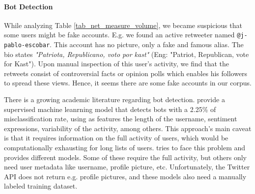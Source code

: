         
        \paragraph{Bot Detection} 
        While analyzing Table \ref{tab_net_measure_volume}, we became suspicious that some users might be fake accounts. E.g. we found an active retweeter named \texttt{@j-pablo-escobar}. %
        This account has no picture, only a fake and famous alias. The bio states {\it "Patriota, Republicano, voto por kast"} (Eng: "Patriot, Republican, vote for Kast"). Upon manual inspection of this user's activity, we find that the retweets consist of controversial facts or opinion polls which enables his followers to spread these views. Hence, it seems there are some fake accounts in our corpus.
        
        There is a growing academic literature regarding bot detection. \cite{efthimion2018supervised} provide a supervised machine leanrning model that detects bots with a 2.25\% of misclassification rate, using as features the length of the username, sentiment expressions, variability of the activity, among others. This approach's main caveat is that it requires information on the full activity of users, which would be computationally exhausting for long lists of users. \cite{knauth2019language} tries to face this problem and provides different models. Some of these require the full activity, but others only need user metadata like username, profile picture, etc. Unfortunately, the Twitter API does not return e.g. profile pictures, and these models also need a manually labeled training dataset.
        
